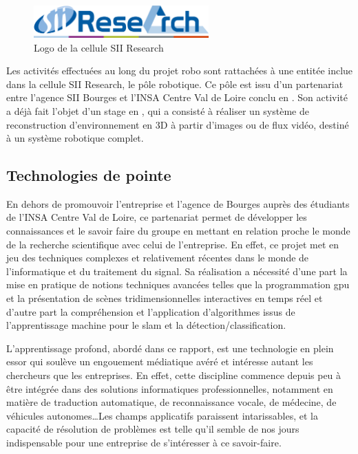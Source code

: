 {{				\begin{figure}[h]
				{
					\centering
					\includegraphics[page=1,width=0.6\textwidth]{figures/siiresearch.png}
					\caption{Logo de la cellule SII Research}
					\label{fig:sii_research}
				}
				\end{figure}
			}
			\par
			{
				Les activités effectuées au long du projet \gls{robo} sont rattachées à une entitée inclue dans la cellule SII Research, le pôle robotique. Ce pôle est issu d'un partenariat entre l'agence SII Bourges et l'INSA Centre Val de Loire conclu en . Son activité a déjà fait l'objet d'un stage en , qui a consisté à réaliser un système de reconstruction d'environnement en 3D à partir d'images ou de flux vidéo\cite{qr3d}, destiné à un système robotique complet.
			}
			
		\subsection{Technologies de pointe}
		
			\par
			{
				En dehors de promouvoir l'entreprise et l'agence de Bourges auprès des étudiants de l'INSA Centre Val de Loire, ce partenariat permet de développer les connaissances et le savoir faire du groupe en mettant en relation proche le monde de la recherche scientifique avec celui de l'entreprise. En effet, ce projet met en jeu des techniques complexes et relativement récentes dans le monde de l'informatique et du traitement du signal. Sa réalisation a nécessité d'une part la mise en pratique de notions techniques avancées telles que la programmation \gls{gpu} et la présentation de scènes tridimensionnelles interactives en temps réel et d'autre part la compréhension et l'application d'algorithmes issus de l'apprentissage machine pour le \gls{slam} et la détection/classification.
			}
			\par
			{
				L'apprentissage profond, abordé dans ce rapport, est une technologie en plein essor qui soulève un engouement médiatique avéré et intéresse autant les chercheurs que les entreprises. En effet, cette discipline commence depuis peu à être intégrée dans des solutions informatiques professionnelles, notamment en matière de traduction automatique\cite{dltra}, de reconnaissance vocale\cite{dlrec}, de médecine\cite{dlmed}, de véhicules autonomes\cite{dlaut}\ldots \newline Les champs applicatifs paraissent intarissables, et la capacité de résolution de problèmes est telle qu'il semble de nos jours indispensable pour une entreprise de s'intéresser à ce savoir-faire.
			}
}
